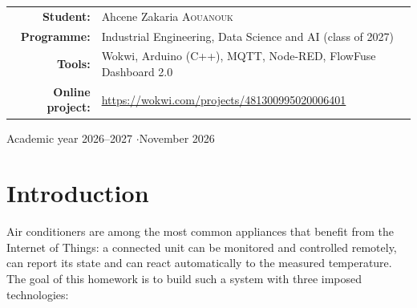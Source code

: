 \documentclass[11pt,a4paper]{article}
\begin{document}
\begin{titlepage}
\vfill
\begin{tabular}{rl}
  \textbf{Student:} & Ahcene Zakaria \textsc{Aouanouk} \\
  \textbf{Programme:} & Industrial Engineering, Data Science and AI (class of 2027)\\
  \textbf{Tools:} & Wokwi, Arduino (C++), MQTT, Node-RED, FlowFuse Dashboard 2.0\\
  \textbf{Online project:} & \url{https://wokwi.com/projects/481300995020006401}\\
\end{tabular}

\vspace{1.2cm}
{\large Academic year 2026--2027 \quad$\cdot$\quad November 2026\par}
\end{titlepage}

\begin{abstract}
\noindent This report presents the design, implementation and testing of a connected air
conditioner prototype. An ESP32 micro-controller reads the room temperature and humidity
from a DHT11 sensor, runs a thermostat with hysteresis that drives a cooling stage, a heating
stage and a variable-speed swinging louver, and displays its state on a local LCD. The device
publishes its telemetry over the MQTT protocol and accepts remote commands (power, mode,
setpoint). A Node-RED flow subscribes to the telemetry and exposes a web dashboard with
gauges, a history chart, status indicators, alerts and remote controls. The whole system was
simulated on Wokwi and tested end to end with a real public MQTT broker and a Node-RED
server running on a Windows laptop. All the scenarios (cooling, heating, fan only, power off,
setpoint change, device disconnection) behaved as specified.
\end{abstract}

\tableofcontents
\listoffigures
\newpage

\section{Introduction}

Air conditioners are among the most common appliances that benefit from the Internet of
Things: a connected unit can be monitored and controlled remotely, can report its state and
can react automatically to the measured temperature. The goal of this homework is to build
such a system with three imposed technologies:
\end{document}
